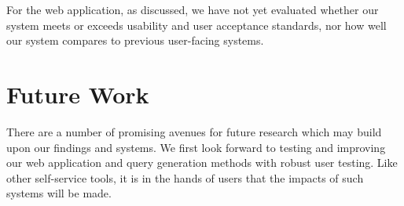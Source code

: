 \documentclass[../main.tex]{subfiles}
\begin{document}
For the web application, as discussed, we have not yet evaluated whether our system meets or exceeds usability and user acceptance standards, nor how well our system compares to previous user-facing systems. 

\section{Future Work}

There are a number of promising avenues for future research which may build upon our findings and systems. We first look forward to testing and improving our web application and query generation methods with robust user testing. Like other self-service tools, it is in the hands of users that the impacts of such systems will be made.
\end{document}
